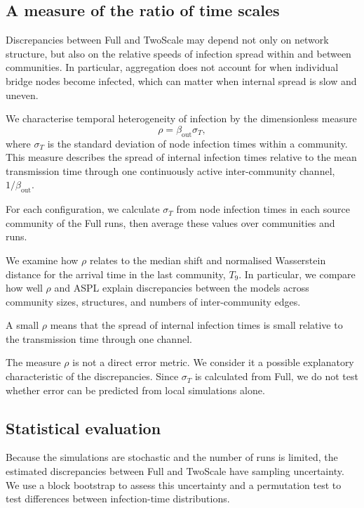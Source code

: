 \documentclass{ieeeaccess}
\newcommand{\Full}{\textup{Full}}
\newcommand{\TS}{\textup{TwoScale}}
\begin{document}
\subsection{A measure of the ratio of time scales}
\label{sec:descriptor}

Discrepancies between \Full{} and \TS{} may depend not only on network structure, but also on the relative speeds of infection spread within and between communities. In particular, aggregation does not account for when individual bridge nodes become infected, which can matter when internal spread is slow and uneven.

We characterise temporal heterogeneity of infection by the dimensionless measure
\begin{equation}
\label{eq:rho}
\rho=\beta_{\mathrm{out}}\sigma_T,
\end{equation}
where $\sigma_T$ is the standard deviation of node infection times within a community. This measure describes the spread of internal infection times relative to the mean transmission time through one continuously active inter-community channel, $1/\beta_{\mathrm{out}}$.

For each configuration, we calculate $\sigma_T$ from node infection times in each source community of the \Full{} runs, then average these values over communities and runs.

We examine how $\rho$ relates to the median shift and normalised Wasserstein distance for the arrival time in the last community, $T_9$. In particular, we compare how well $\rho$ and ASPL explain discrepancies between the models across community sizes, structures, and numbers of inter-community edges.

A small $\rho$ means that the spread of internal infection times is small relative to the transmission time through one channel.

The measure $\rho$ is not a direct error metric. We consider it a possible explanatory characteristic of the discrepancies. Since $\sigma_T$ is calculated from \Full{}, we do not test whether error can be predicted from local simulations alone.

\subsection{Statistical evaluation}

Because the simulations are stochastic and the number of runs is limited, the estimated discrepancies between \Full{} and \TS{} have sampling uncertainty. We use a block bootstrap to assess this uncertainty and a permutation test to test differences between infection-time distributions.
\end{document}
